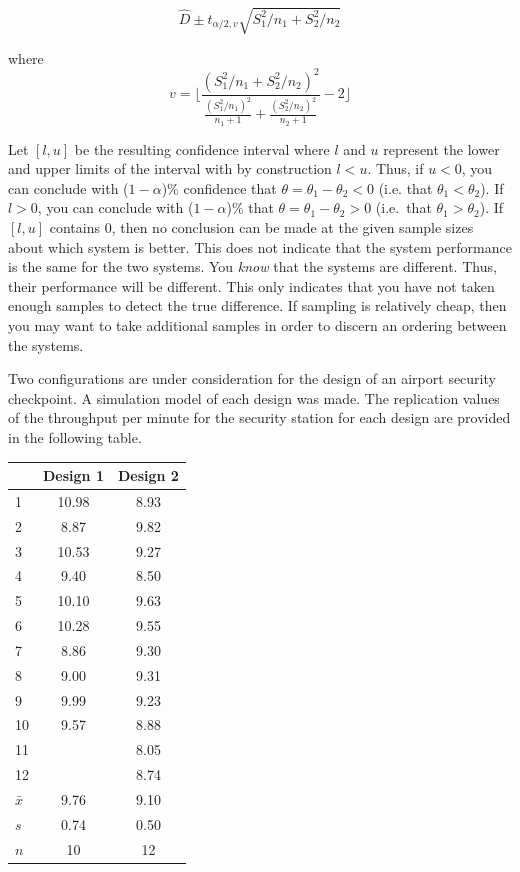\documentclass[
]{book}
\theoremstyle{definition}
\theoremstyle{definition}
\theoremstyle{definition}
\theoremstyle{definition}
\theoremstyle{remark}
\begin{document}
\[\hat{D} \pm t_{\alpha/2 , v} \sqrt{S_1^2/n_1 + S_2^2/n_2}\]

where
\[v = \Biggl\lfloor \frac{(S_1^2/n_1 + S_2^2/n_2)^2}{\frac{(S_1^2/n_1)^2}{n_1 +1} + \frac{(S_2^2/n_2)^2}{n_2 + 1}} - 2 \Biggr\rfloor\]

Let \([l, u]\) be the resulting confidence interval where \(l\) and \(u\)
represent the lower and upper limits of the interval with by
construction \(l < u\). Thus, if \(u < 0\), you can conclude with
(\(1 - \alpha\))\% confidence that \(\theta = \theta_1 - \theta_2 < 0\) (i.e.
that \(\theta_1 < \theta_2\)). If \(l > 0\), you can conclude with
(\(1 - \alpha\))\% that \(\theta = \theta_1 - \theta_2 > 0\) (i.e.~that
\(\theta_1 > \theta_2\)). If \([l, u]\) contains 0, then no conclusion can
be made at the given sample sizes about which system is better. This
does not indicate that the system performance is the same for the two
systems. You \emph{know} that the systems are different. Thus, their
performance will be different. This only indicates that you have not
taken enough samples to detect the true difference. If sampling is
relatively cheap, then you may want to take additional samples in order
to discern an ordering between the systems.

Two configurations are under consideration for the design of an airport
security checkpoint. A simulation model of each design was made. The
replication values of the throughput per minute for the security station
for each design are provided in the following table.

\begin{longtable}[]{@{}lcc@{}}
\toprule
& Design 1 & Design 2 \\
\midrule
\endhead
1 & 10.98 & 8.93 \\
2 & 8.87 & 9.82 \\
3 & 10.53 & 9.27 \\
4 & 9.40 & 8.50 \\
5 & 10.10 & 9.63 \\
6 & 10.28 & 9.55 \\
7 & 8.86 & 9.30 \\
8 & 9.00 & 9.31 \\
9 & 9.99 & 9.23 \\
10 & 9.57 & 8.88 \\
11 & & 8.05 \\
12 & & 8.74 \\
\(\bar{x}\) & 9.76 & 9.10 \\
\(s\) & 0.74 & 0.50 \\
\(n\) & 10 & 12 \\
\bottomrule
\end{longtable}
\end{document}
